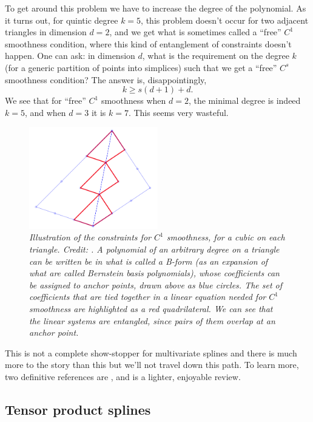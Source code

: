 \documentclass{article}
\begin{document}
To get around this problem we have to increase the degree of the polynomial. As
it turns out, for quintic degree $k=5$, this problem doesn't occur for two
adjacent triangles in dimension $d=2$, and we get what is sometimes called a
``free'' $C^1$ smoothness condition, where this kind of entanglement of
constraints doesn't happen. One can ask: in dimension $d$, what is the
requirement on the degree $k$ (for a generic partition of points into simplices)
such that we get a ``free'' $C^s$ smoothness condition? The answer is,
disappointingly,              
\[
k \geq s(d+1) + d.
\]
We see that for ``free'' $C^1$ smoothness when $d=2$, the minimal degree is
indeed $k=5$, and when $d=3$ it is $k=7$. This seems very wasteful.   

\begin{figure}[tb]
\centering
\includegraphics[width=0.5\textwidth]{c1_cubic.png}
\caption{\it Illustration of the constraints for $C^1$ smoothness, for a cubic
  on each triangle. Credit: \citet{deboor2009way}. A polynomial of an arbitrary
  degree on a triangle can be written be in what is called a B-form (as an
  expansion of what are called Bernstein basis polynomials), whose coefficients
  can be assigned to anchor points, drawn above as blue circles. The set of
  coefficients that are tied together in a linear equation needed for $C^1$
  smoothness are highlighted as a red quadrilateral. We can see that the linear
  systems are entangled, since pairs of them overlap at an anchor point.}     
\label{fig:c1_constraints}
\end{figure}

This is not a complete show-stopper for multivariate splines and there is much
more to the story than this but we'll not travel down this path. To learn more,
two definitive references are \citet{deboor1993box, lai2007spline}, and
\citet{deboor2009way} is a lighter, enjoyable review.    

\subsection{Tensor product splines}
\end{document}

